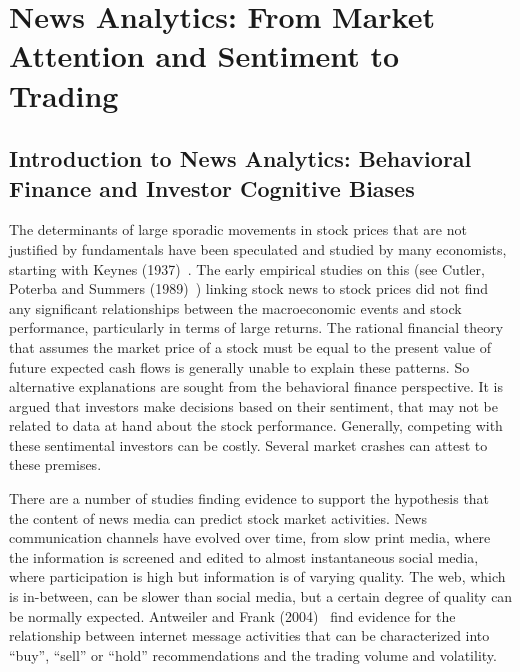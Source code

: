 \chapter{News Analytics: From Market Attention and Sentiment to Trading \label{chap:ch_news_an}} \label{in:newsan1}
\section{Introduction to News Analytics: Behavioral Finance and Investor Cognitive Biases}\label{in:behave1}
 
 The determinants of large sporadic movements in stock prices that are not justified by fundamentals have been speculated and studied by many economists, starting with Keynes (1937)~\cite{keynes1937general}. The early empirical studies on this (see Cutler, Poterba and Summers (1989)~\cite{cutler1988moves}) linking stock news to stock prices did not find any significant relationships between the macroeconomic events and stock performance, particularly in terms of large returns. The rational financial theory that assumes the market price of a stock must be equal to the present value of future expected cash flows is generally unable to explain these patterns. So alternative explanations are sought from the behavioral finance perspective. It is argued that investors make decisions based on their sentiment, that may not be related to data at hand about the stock performance. Generally, competing with these sentimental investors can be costly. Several market crashes can attest to these premises.
 
 
 There are a number of studies finding evidence to support the hypothesis that the content of news media can predict stock market activities. News communication channels have evolved over time, from slow print media, where the information is screened and edited to almost instantaneous social media, where participation is high but information is of varying quality. The web, which is in-between, can be slower than social media, but a certain degree of quality can be normally expected. Antweiler and Frank (2004)~\cite{antweiler2004all} find evidence for the relationship between internet message activities that can be characterized into ``buy'', ``sell'' or ``hold'' recommendations and the trading volume and volatility.
 
